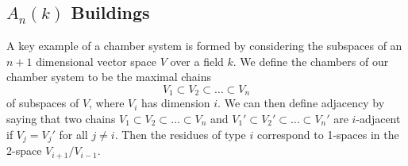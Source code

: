 \documentclass[11pt]{article}
\begin{document}




\subsection{$A_n(k)$ Buildings}

A key example of a chamber system is formed by considering the subspaces of an $n+1$ dimensional vector space $V$ over a field $k$. We define the chambers of our chamber system to be the maximal chains \[V_1\subset V_2\subset \hdots \subset V_n\] of subspaces of $V$, where $V_i$ has dimension $i$. We can then define adjacency by saying that two chains $V_1\subset V_2\subset \hdots \subset V_n$ and $V_1'\subset V_2'\subset \hdots \subset V_n'$ are $i$-adjacent if $V_j=V_j'$ for all $j\neq i$. Then the residues of type $i$ correspond to 1-spaces in the 2-space $V_{i+1}/V_{i-1}$. 


\end{document}
